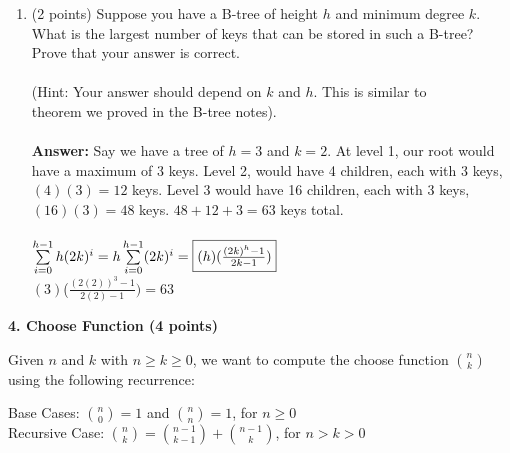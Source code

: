 \documentclass[12pt]{elsart}
\begin{document}
\begin{enumerate}
\newpage
   \item (2 points) Suppose you have a B-tree of height $h$ and minimum degree $k$. What is the largest number of keys that can be stored in such a B-tree?  Prove that your answer is correct.
\\\\(Hint: Your answer should depend on $k$ and $h$. This is similar to \\theorem we proved in the B-tree notes).\\\\
	{\bf Answer:}
	Say we have a tree of $h=3$ and $k=2$. At level 1, our root would have a maximum of 3 keys. Level 2, would have 4 children, each with 3 keys, $(4)(3)=12$ keys. Level 3 would have 16 children, each with 3 keys, $(16)(3)=48$  keys. $48+12+3=63$ keys total.\\\\
	$\sum\limits_{i=0}^{h-1}h(2k)^i = h\sum\limits_{i=0}^{h-1}(2k)^i = \boxed{(h)$($\frac{(2k)^h-1}{2k-1})}$\\
	$(3)$($\frac{(2(2))^3-1}{2(2)-1}) = 63$\\
\end{enumerate}
\newpage
{\bf 4.  Choose Function (4 points)}

Given $n$ and $k$ with $n \geq k \geq 0$, we want to compute the choose function ${n \choose k}$ using the following recurrence:

\hspace*{0.5cm} Base Cases: ${n \choose 0}=1$ and ${n \choose n}=1$, for $n\geq 0$\\
\hspace*{0.5cm} Recursive Case: ${n \choose k} = {n-1 \choose k-1} + {n-1 \choose k}$, for $n>k>0$
\end{document}
